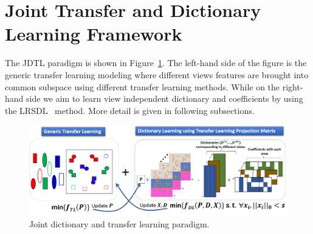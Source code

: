 \section{Joint Transfer and Dictionary Learning Framework}

The JDTL paradigm is shown in Figure~\ref{fig1:JLP}. The left-hand side of the figure is the generic transfer learning modeling where different views features are brought into common subspace using different transfer learning methods. While on the right-hand side we aim to learn view independent dictionary and coefficients by using the LRSDL~\cite{7987024} method. More detail is given in following subsections.

\begin{figure}[!ht]
	\centering
	\includegraphics[width=.66\textheight]{figures/JLPara2}
	\linebreak
	\caption{Joint dictionary and transfer learning paradigm.}
	\label{fig1:JLP}
\end{figure}
